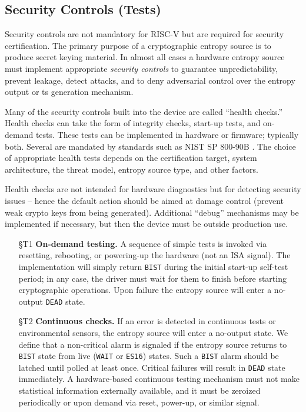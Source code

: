{\begin{itemize}
    \end{itemize}


\subsection{Security Controls (Tests)}
\label{sec:security-controls}

    Security controls are not mandatory for RISC-V but are required for
    security certification.
    The primary purpose of a cryptographic entropy source is to produce
    secret keying material. In almost all cases a hardware entropy source
    must implement appropriate \emph{security controls} to guarantee
    unpredictability, prevent leakage, detect attacks, and to deny
    adversarial control over the entropy output or ts generation mechanism.

    Many of the security controls built into the device are called ``health
    checks.'' Health checks can take the form of
    integrity checks, start-up tests, and on-demand tests. These tests can
    be implemented in hardware or firmware; typically both. Several are
    mandated by standards such as NIST SP 800-90B \cite{NI19}. The choice
    of appropriate health tests depends on the certification target,
    system architecture, the threat model, entropy source type, and other
    factors.

    Health checks are not intended for hardware diagnostics but for
    detecting security issues -- hence the default action should be aimed
    at damage control (prevent weak crypto keys from being
    generated). Additional ``debug'' mechanisms may be implemented if
    necessary, but then the device must be outside production use.

    \begin{itemize}

    \item[\S T1]    {\bf On-demand testing.}
    A sequence of simple tests is invoked via resetting, rebooting, or
    powering-up the hardware (not an ISA signal). The implementation will
    simply return  \verb|BIST| during the initial start-up self-test period;
    in any case, the driver must wait for them to finish before starting
    cryptographic operations. Upon failure the entropy source will enter a
    no-output \verb|DEAD| state.

    \item[\S T2]    {\bf Continuous checks.}
    If an error is detected in continuous tests or environmental sensors,
    the entropy source will enter a no-output state.  We define that a
    non-critical alarm is signaled if the entropy source returns
    to \verb|BIST| state from live (\verb|WAIT| or \verb|ES16|) states.
    Such a \verb|BIST| alarm should be latched until polled at least once.
    Critical failures will result in \verb|DEAD| state immediately.
    A hardware-based continuous testing mechanism must not make statistical
    information externally available, and it must be zeroized periodically or
    upon demand via reset, power-up, or similar signal.


\end{itemize}}

